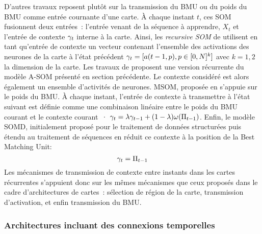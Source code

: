\documentclass[../main]{subfiles}
\begin{document}
D'autres travaux reposent plutôt sur la transmission du BMU ou du poids du BMU comme entrée cournante d'une carte.
\`A chaque instant $t$, ces SOM fusionnent deux entrées~: l'entrée venant de la séquence à apprendre, $X_t$ et l'entrée de contexte $\gamma_t$ interne à la carte.
Ainsi, les \emph{recursive SOM} de \cite{Voegtlin2002RecursiveSM} utilisent en tant qu'entrée de contexte un vecteur contenant l'ensemble des activations des neurones de la carte à l'état précédent $\gamma_t = [a(t-1,p), p \in [0,N]^k]$ avec $k = 1, 2$ la dimension de la carte.
Les travaux de \cite{Buonamente2013SimulatingAW} proposent une version récurrente du modèle A-SOM présenté en section précédente. 
Le contexte considéré est alors également un ensemble d'activités de neurones. 
MSOM, proposée en \cite{Strickert2005MergeSF} s'appuie sur le poids du BMU. 
\`A chaque instant, l'entrée de contexte à transmettre à l'état suivant est définie comme une combinaison linéaire entre le poids du BMU courant et le contexte courant~·
$\gamma_t = \lambda \gamma_{t-1} + (1-\lambda)\omega(\Pi_{t-1}) $.
Enfin, le modèle SOMD, initialement proposé pour le traitement de données structurées \parencite{hagenbuchner_self-organizing_2003} puis étendu au traitement de séquences en \cite{hammer_recursive_2004,hammer_self-organizing_2005} réduit ce contexte à la position de la Best Matching Unit:
$$ \gamma_{t} = \Pi_{t-1}$$
Les mécanismes de transmission de contexte entre instants dans les cartes récurrentes s'appuient donc sur les mêmes mécanismes que ceux proposés dans le cadre d'architectures de cartes~: sélection de région de la carte, transmission d'activation, et enfin transmission du BMU.

\subsubsection{Architectures incluant des connexions temporelles}
\end{document}
